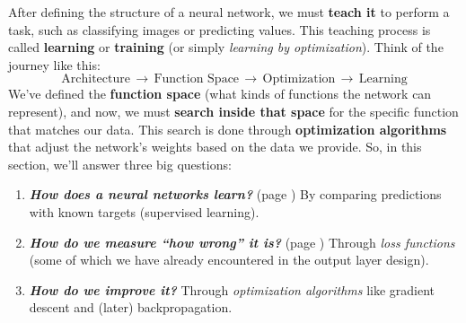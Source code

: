 \highspace
After defining the structure of a neural network, we must \textbf{teach it} to perform a task, such as classifying images or predicting values. This teaching process is called \textbf{learning} or \textbf{training} (or simply \emph{learning by optimization}). Think of the journey like this:
\begin{equation*}
    \text{Architecture} \, \rightarrow \,
    \text{Function Space} \, \rightarrow \,
    \text{Optimization} \, \rightarrow \,
    \text{Learning}
\end{equation*}
We've defined the \textbf{function space} (what kinds of functions the network can represent), and now, we must \textbf{search inside that space} for the specific function that matches our data. This search is done through \textbf{optimization algorithms} that adjust the network's weights based on the data we provide. So, in this section, we'll answer three big questions:
\begin{enumerate}
    \item \emph{\textbf{How does a neural networks learn?}} (page \pageref{sec:supervised-learning-and-training-dataset}) By comparing predictions with known targets (supervised learning).
    \item \emph{\textbf{How do we measure ``how wrong'' it is?}} (page \pageref{sec:error-minimization-and-loss-function}) Through \emph{loss functions} (some of which we have already encountered in the output layer design).
    \item \emph{\textbf{How do we improve it?}} Through \emph{optimization algorithms} like gradient descent and (later) backpropagation.
\end{enumerate}